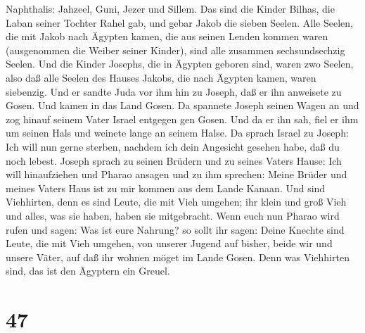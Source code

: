 Naphthalis: Jahzeel, Guni, Jezer und Sillem.  Das sind die
Kinder Bilhas, die Laban seiner Tochter Rahel gab, und gebar Jakob die
sieben Seelen.  Alle Seelen, die mit Jakob nach Ägypten
kamen, die aus seinen Lenden kommen waren (ausgenommen die Weiber seiner
Kinder), sind alle zusammen sechsundsechzig Seelen.  Und
die Kinder Josephs, die in Ägypten geboren sind, waren zwo Seelen, also
daß alle Seelen des Hauses Jakobs, die nach Ägypten kamen, waren
siebenzig.  Und er sandte Juda vor ihm hin zu Joseph, daß
er ihn anweisete zu Gosen. Und kamen in das Land Gosen.  Da
spannete Joseph seinen Wagen an und zog hinauf seinem Vater Israel
entgegen gen Gosen. Und da er ihn sah, fiel er ihm um seinen Hals und
weinete lange an seinem Halse.  Da sprach Israel zu Joseph:
Ich will nun gerne sterben, nachdem ich dein Angesicht gesehen habe, daß
du noch lebest.  Joseph sprach zu seinen Brüdern und zu
seines Vaters Hause: Ich will hinaufziehen und Pharao ansagen und zu ihm
sprechen: Meine Brüder und meines Vaters Haus ist zu mir kommen aus dem
Lande Kanaan.  Und sind Viehhirten, denn es sind Leute, die
mit Vieh umgehen; ihr klein und groß Vieh und alles, was sie haben,
haben sie mitgebracht.  Wenn euch nun Pharao wird rufen und
sagen: Was ist eure Nahrung?  so sollt ihr sagen: Deine
Knechte sind Leute, die mit Vieh umgehen, von unserer Jugend auf bisher,
beide wir und unsere Väter, auf daß ihr wohnen möget im Lande Gosen.
Denn was Viehhirten sind, das ist den Ägyptern ein Greuel.

\hypertarget{section-46}{%
\section{47}\label{section-46}}

